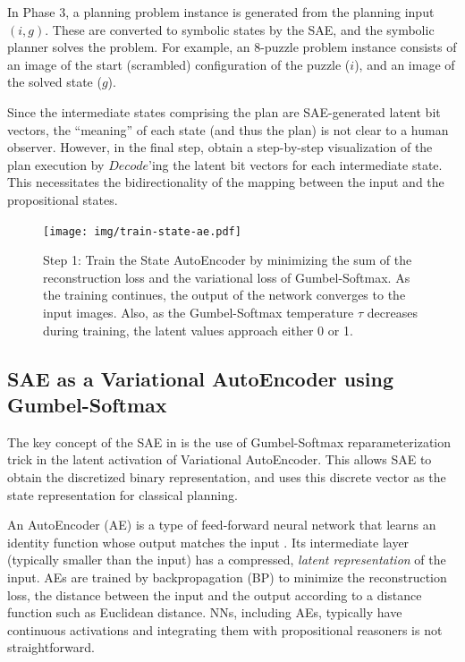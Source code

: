 In Phase 3, a planning problem instance is generated from the planning input $(i,g)$.
These are converted to symbolic states by the SAE, and the symbolic planner solves the problem.
For example, an 8-puzzle problem instance consists of an image of the start (scrambled) configuration of the puzzle ($i$), and an image of the solved state ($g$).

Since the intermediate states comprising the plan are SAE-generated latent bit vectors, the ``meaning'' of each state (and thus the plan) is not clear to a human observer.
However, in the final step, \latentplanner obtain a step-by-step visualization of the plan execution
by $Decode$'ing the latent bit vectors for each intermediate state.
This necessitates the bidirectionality of the mapping between the input and the propositional states.

\begin{figure}[htb]
 \texttt{[image: img/train-state-ae.pdf]}
 \caption{Step 1:
Train the State AutoEncoder by
 minimizing the sum of the reconstruction loss and the variational loss of Gumbel-Softmax.
As the training continues, the output of the network converges to the input images.
Also, as the Gumbel-Softmax temperature $\tau$ decreases during training,
the latent values approach either 0 or 1.}
 \label{sae}
\end{figure}

\subsection{SAE as a Variational AutoEncoder using Gumbel-Softmax}

The key concept of the SAE in \latentplanner is the use of Gumbel-Softmax \cite{jang2016categorical}
reparameterization trick in the latent activation of Variational AutoEncoder.
This allows SAE to obtain the
discretized binary representation, and \latentplanner uses this
discrete vector as the state representation for classical planning.

An AutoEncoder (AE) is a type of feed-forward neural network that learns an identity function whose output matches the input \cite{hinton2006reducing}.
Its intermediate layer (typically smaller than the input) has a compressed, \emph{latent representation} of the input.
AEs are trained by backpropagation (BP) to minimize the reconstruction loss, the distance between the input and the output according to a distance function such as Euclidean distance.
NNs, including AEs, typically have continuous activations and integrating them with propositional reasoners is not straightforward.

